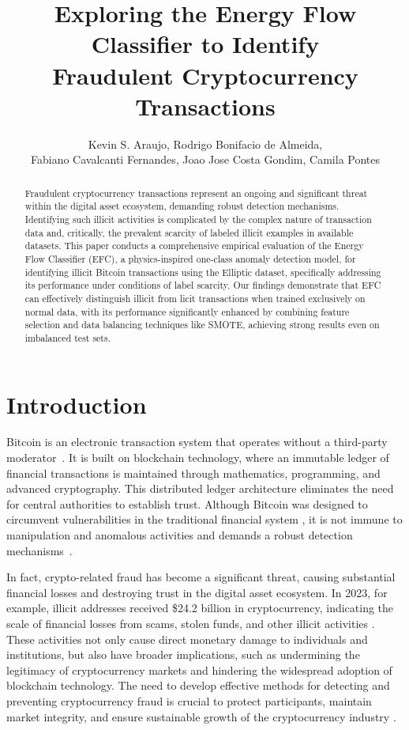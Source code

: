 \documentclass[12pt]{article}
\title{Exploring the Energy Flow Classifier to Identify \\ Fraudulent Cryptocurrency Transactions}
\author{Kevin S. Araujo\inst{1}, Rodrigo Bonifacio de Almeida\inst{1}, \\ Fabiano Cavalcanti Fernandes\inst{2}, Joao Jose
Costa Gondim\inst{1}, Camila Pontes\inst{1}}
\begin{document}
 

\maketitle

\begin{abstract}
  Fraudulent cryptocurrency transactions represent an ongoing and significant threat within the digital asset ecosystem,
  demanding robust detection mechanisms. Identifying such illicit activities is complicated by the complex nature of transaction
  data and, critically, the prevalent scarcity of labeled illicit examples in available datasets. This paper conducts a
  comprehensive empirical evaluation of the Energy Flow Classifier (EFC), a physics-inspired one-class anomaly detection
  model, for identifying illicit Bitcoin transactions using the Elliptic dataset, specifically addressing its performance
  under conditions of label scarcity. Our findings demonstrate that EFC can effectively distinguish illicit from licit
  transactions when trained exclusively on normal data, with its performance significantly enhanced by combining feature
  selection and data balancing techniques like SMOTE, achieving strong results even on imbalanced test sets.
\end{abstract}

\section{Introduction} \label{sec:introduction}
Bitcoin is an electronic transaction system that operates without a third-party moderator~\cite{nakamoto2008bitcoin}. It is
built on blockchain technology, where an immutable ledger of financial transactions is maintained through mathematics,
programming, and advanced cryptography. This distributed ledger architecture eliminates the need for central authorities
to establish trust. Although Bitcoin was designed to circumvent vulnerabilities in the traditional financial system
\cite{nakamoto2008bitcoin}, it is not immune to manipulation and anomalous activities and demands a robust detection
mechanisms~\cite{fang2022cryptocurrency, zhang2020financial,zainal2018review}. 

In fact, crypto-related fraud has become a significant threat, causing substantial financial losses and destroying
trust in the digital asset ecosystem. In 2023, for example, illicit addresses received \$24.2 billion in cryptocurrency,
indicating the scale of financial losses from scams, stolen funds, and other illicit activities \cite{chainalysis2024cryptocrime}.
These activities not only cause direct monetary damage to individuals and institutions, but also have broader implications,
such as undermining the legitimacy of cryptocurrency markets and hindering the widespread adoption of blockchain technology.
The need to develop effective methods for detecting and preventing cryptocurrency fraud is crucial to protect participants,
maintain market integrity, and ensure sustainable growth of the cryptocurrency industry \cite{scharfman2024, Khiari2025}.
\end{document}
